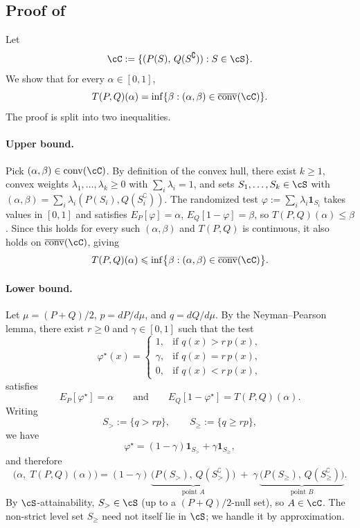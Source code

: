 \documentclass[english]{article}
\theoremstyle{plain}
\theoremstyle{definition}
\newcommand{\Toff}[2]{T(#1,#2)}
\newcommand{\convclosure}{\overline{\mathrm{conv}}}
\begin{document}
\subsection{Proof of }\label{sec:proof-convex-closure}


Let
\[
\cC := \{(P(S),\,Q(S^\complement)) : S\in\cS\}.
\]
We show that for every $\alpha\in[0,1]$,
\[
\Toff{P}{Q}(\alpha)
=
\inf\{\beta : (\alpha,\beta)\in \convclosure(\cC)\}.
\]
The proof is split into two inequalities.

\paragraph{Upper bound.}
Pick $(\alpha,\beta)\in\mathrm{conv}(\cC)$. By definition of the convex hull, there exist $k\geqslant 1$, convex weights $\lambda_1,\dots,\lambda_k\geqslant 0$ with $\sum_i\lambda_i=1$, and sets $S_1,\dots,S_k\in\cS$ with $(\alpha,\beta)=\sum_i\lambda_i(P(S_i),Q(S_i^\complement))$. The randomized test $\varphi:=\sum_i\lambda_i\mathbf 1_{S_i}$ takes values in $[0,1]$ and satisfies $E_P[\varphi]=\alpha$, $E_Q[1-\varphi]=\beta$, so $\Toff{P}{Q}(\alpha)\leqslant\beta$. Since this holds for every such $(\alpha,\beta)$ and $\Toff{P}{Q}$ is continuous, it also holds on $\convclosure(\cC)$, giving
\[
\Toff{P}{Q}(\alpha)\leqslant \inf\bigl\{\beta:(\alpha,\beta)\in\convclosure(\cC)\bigr\}.
\]

\paragraph{Lower bound.}
Let $\mu=(P+Q)/2$, $p=dP/d\mu$, and $q=dQ/d\mu$.
By the Neyman--Pearson lemma, there exist $r \geqslant 0$ and $\gamma \in [0,1]$ such that the test
\[
\varphi^\star(x) = \begin{cases}
1, & \text{if } q(x) > r\,p(x), \\[2pt]
\gamma, & \text{if } q(x) = r\,p(x), \\[2pt]
0, & \text{if } q(x) < r\,p(x),
\end{cases}
\]
satisfies
\[
E_P[\varphi^\star] = \alpha
\qquad\text{and}\qquad
E_Q[1-\varphi^\star] = \Toff{P}{Q}(\alpha).
\]
Writing
\[
S_{>}:=\{q>rp\},
\qquad
S_{\geqslant}:=\{q\geqslant rp\},
\]
we have
\[
\varphi^\star=(1-\gamma)\mathbf{1}_{S_{>}}+\gamma\mathbf{1}_{S_{\geqslant}},
\]
and therefore
\begin{equation}\label{eq:convex-decomp}
\bigl(\alpha,\; \Toff{P}{Q}(\alpha)\bigr)
=
(1-\gamma)\,\underbrace{\bigl(P(S_{>}),\, Q(S_{>}^\complement)\bigr)}_{\text{point } A}
\;+\;
\gamma\,\underbrace{\bigl(P(S_{\geqslant}),\, Q(S_{\geqslant}^\complement)\bigr)}_{\text{point } B}.
\end{equation}
By $\cS$-attainability, $S_{>}\in\cS$ (up to a $(P+Q)/2$-null set), so $A\in\cC$. The non-strict level set $S_{\geqslant}$ need not itself lie in $\cS$; we handle it by approximation.
\end{document}
